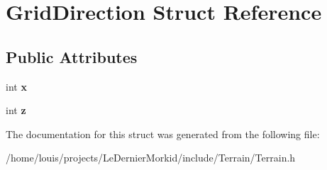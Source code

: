 \hypertarget{struct_grid_direction}{}\section{Grid\+Direction Struct Reference}
\label{struct_grid_direction}
\subsection*{Public Attributes}
\begin{DoxyCompactItemize}
\item 
\mbox{\label{struct_grid_direction_a290ac1961ef3d29c634d482c235f86de}} 
int {\bfseries x}
\item 
\mbox{\label{struct_grid_direction_afb0df84ade3f8e9b6b0adec5b7294c32}} 
int {\bfseries z}
\end{DoxyCompactItemize}


The documentation for this struct was generated from the following file\+:\begin{DoxyCompactItemize}
\item 
/home/louis/projects/\+Le\+Dernier\+Morkid/include/\+Terrain/Terrain.\+h\end{DoxyCompactItemize}
